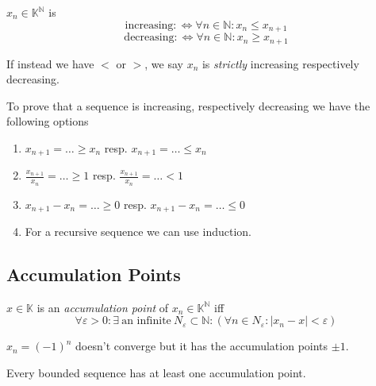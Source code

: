 \begin{definition}
   \(x_n \in \mathbb{K}^\mathbb{N}\) is
   \[\text{increasing} :\iff \forall n \in \mathbb{N}: x_n \leq x_{n+1}\]
   \[\text{decreasing} :\iff \forall n \in \mathbb{N}: x_n \geq x_{n+1}\]
\end{definition}
\begin{remark}[Terminology]
   If instead we have \(<\) or \(>\), we say \(x_n\) is \emph{strictly} increasing respectively decreasing.
\end{remark}
\begin{remark}[Intuition]
   To prove that a sequence is increasing, respectively decreasing we have the following options
   \begin{enumerate}
      \item \(x_{n+1} = \ldots \geq x_n\) resp. \(x_{n+1} = \ldots \leq x_n\)
      \item \(\frac{x_{n+1}}{x_n} = \ldots \geq 1\) resp. \(\frac{x_{n+1}}{x_n} = \ldots < 1\)
      \item \(x_{n+1} - x_n = \ldots \geq 0\) resp. \(x_{n+1} - x_n = \ldots \leq 0\)
      \item For a recursive sequence we can use induction.
   \end{enumerate}
\end{remark}

\subsection{Accumulation Points}
\begin{definition}
   \(x \in \mathbb{K}\) is an \emph{accumulation point} of \(x_n \in \mathbb{K}^\mathbb{N}\) iff
   \[\forall \varepsilon > 0: \exists~\text{an infinite}~N_{\varepsilon} \subset \mathbb{N}: (\forall n \in N_\varepsilon: |x_n - x| < \varepsilon)\]
\end{definition}
\begin{example}
   \(x_n = (-1)^n\) doesn't converge but it has the accumulation points \(\pm 1\).
\end{example}

\begin{theorem}\label{thm:bolzano}
   Every bounded sequence has at least one accumulation point.
\end{theorem}

